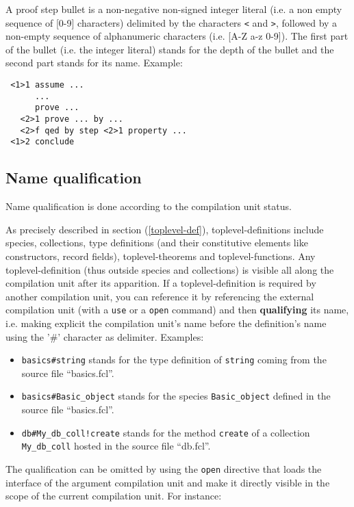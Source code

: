 A proof step bullet is a non-negative non-signed integer literal
(i.e. a non empty sequence of [0-9] characters) delimited by the
characters {\tt <} and {\tt >}, followed by a non-empty sequence of
alphanumeric characters (i.e. [A-Z a-z 0-9]).
The first part of the bullet (i.e. the integer literal) stands for the
depth of the bullet and the second part stands for its name. Example:
{\scriptsize
\begin{lstlisting}
 <1>1 assume ...
      ...
      prove ...
   <2>1 prove ... by ...
   <2>f qed by step <2>1 property ...
 <1>2 conclude
\end{lstlisting}
}

\subsection{Name qualification}
\label{qualified-name}
 

Name qualification is done according to the
compilation unit status.

As precisely described in section (\ref{toplevel-def}),
toplevel-definitions include species, collections, type definitions
(and their constitutive elements like constructors, record fields),
toplevel-theorems and toplevel-functions.  Any toplevel-definition (thus
outside species and collections) is visible all along the compilation unit
after its apparition.
If a toplevel-definition is required by another compilation unit, you can
reference it by referencing the external compilation unit
(with a {\tt use} or a {\tt open} command) and then
{\bf qualifying} its name, i.e. making explicit the
compilation unit's name before the definition's name using the '\#'
character as delimiter. Examples:

\begin{itemize}
  \item {\tt basics\#string} stands for the type definition of
    {\tt string} coming from the source file ``basics.fcl''.
  \item {\tt  basics\#Basic\_object} stands for the species
    {\tt Basic\_object} defined in the source file ``basics.fcl''.
  \item {\tt db\#My\_db\_coll!create} stands for the method
    {\tt create} of a collection {\tt My\_db\_coll} hosted in the
    source file ``db.fcl''.
\end{itemize}

The qualification can be omitted by using the {\tt open} directive
that loads the interface of the argument compilation unit and make it
directly visible in the scope of the current compilation unit. For
instance:

